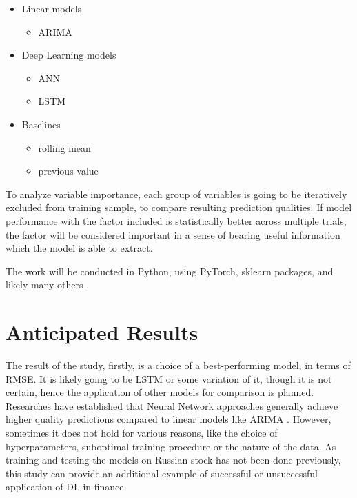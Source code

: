 \documentclass{elsarticle}
\begin{document}
\begin{itemize}
	\item Linear models
	\begin{itemize}
		\item ARIMA
	\end{itemize}

	\item Deep Learning models
	\begin{itemize}
		\item ANN
		\item LSTM
	\end{itemize}

	\item Baselines
	\begin{itemize}
		\item rolling mean
		\item previous value
	\end{itemize}
\end{itemize}

To analyze variable importance, each group of variables is going to be iteratively excluded from training sample, to compare resulting prediction qualities. If model performance with the factor included is statistically better across multiple trials, the factor will be considered important in a sense of bearing useful information which the model is able to extract.

The work will be conducted in Python, using PyTorch, sklearn packages, and likely many others \citep{van_rossum_python_2009, pedregosa_scikit-learn_2011, paszke_pytorch_2019}.

\section{Anticipated Results}

The result of the study, firstly, is a choice of a best-performing model, in terms of RMSE. It is likely going to be LSTM or some variation of it, though it is not certain, hence the application of other models for comparison is planned. Researches have established that Neural Network approaches generally achieve higher quality predictions compared to linear models like ARIMA \citep{siami-namini_comparison_2018}. However, sometimes it does not hold for various reasons, like the choice of hyperparameters, suboptimal training procedure or the nature of the data. As training and testing the models on Russian stock has not been done previously, this study can provide an additional example of successful or unsuccessful application of DL in finance.
\end{document}
